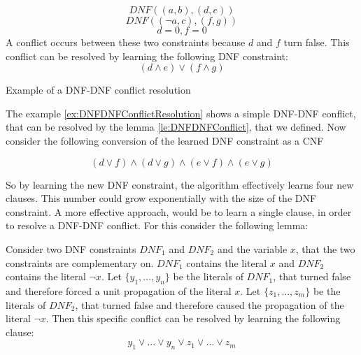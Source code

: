 \begin{example}
\begin{leftbar}
\begin{displaymath}
DNF((a,b),(d,e))
\end{displaymath}
\begin{displaymath}
DNF((\neg a, c),(f,g))
\end{displaymath}
\begin{displaymath}
d = 0, f = 0
\end{displaymath}
A conflict occurs between these two constraints because $d$ and $f$ turn false. This conflict can be resolved by learning the following DNF constraint:
\begin{displaymath}
(d \wedge e) \vee (f \wedge g)
\end{displaymath}
\end{leftbar}
\caption{Example of a DNF-DNF conflict resolution}
\label{ex:DNFDNFConflictResolution}
\end{example}

The example \ref{ex:DNFDNFConflictResolution} shows a simple DNF-DNF conflict, that can be resolved by the lemma \ref{le:DNFDNFConflict}, that we defined. Now consider the following conversion of the learned DNF constraint as a CNF

\begin{leftbar}
\begin{displaymath}
(d \vee f) \wedge (d \vee g) \wedge (e \vee f) \wedge (e \vee g)
\end{displaymath}
\end{leftbar}

So by learning the new DNF constraint, the algorithm effectively learns four new clauses. This number could grow exponentially with the size of the DNF constraint. A more effective approach, would be to learn a single clause, in order to resolve a DNF-DNF conflict. For this consider the following lemma:

\begin{lemma}
\begin{leftbar}
Consider two DNF constraints $DNF_1$ and $DNF_2$ and the variable $x$, that the two constraints are complementary on. $DNF_1$ contains the literal $x$ and $DNF_2$ contains the literal $\neg x$. Let $\{y_1,...,y_n\}$ be the literals of $DNF_1$, that turned false and therefore forced a unit propagation of the literal $x$. Let $\{z_1,...,z_m\}$ be the literals of $DNF_2$, that turned false and therefore caused the propagation of the literal $\neg x$. Then this specific conflict can be resolved by learning the following clause:
\begin{displaymath}
y_1 \vee ... \vee y_n \vee z_1 \vee ... \vee z_m
\end{displaymath}
\end{leftbar}
\label{le:DNFDNFConflictAlt}
\end{lemma}

